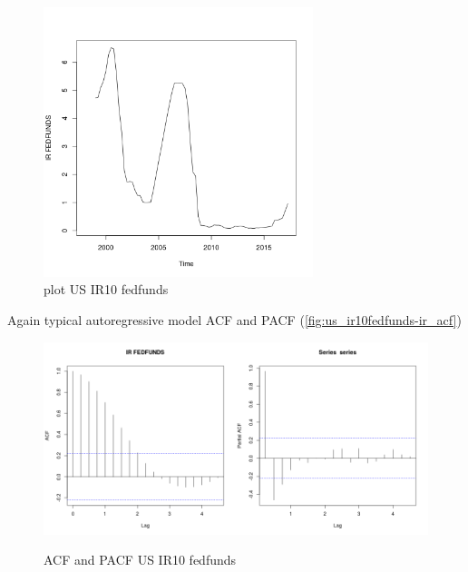 \documentclass[10pt]{article}
\begin{document}
\begin{figure}[h!]
\centering
\includegraphics[width = 0.7\textwidth]{"../plots/us_IR FEDFUNDS"}
\caption{plot US IR10 fedfunds}
\label{fig:us_ir10fedfunds}
\end{figure}

Again typical autoregressive model ACF and PACF (\autoref{fig:us_ir10fedfunds-ir_acf})

\begin{figure}[h!]
\centering
\includegraphics[width = 0.5\textwidth]{"../acf/us_IR FEDFUNDS"}\includegraphics[width = 0.5\textwidth]{"../pacf/us_IR FEDFUNDS"}
\caption{ACF and PACF US IR10 fedfunds}
\label{fig:us_ir10fedfunds-ir_acf}
\end{figure}
\end{document}
